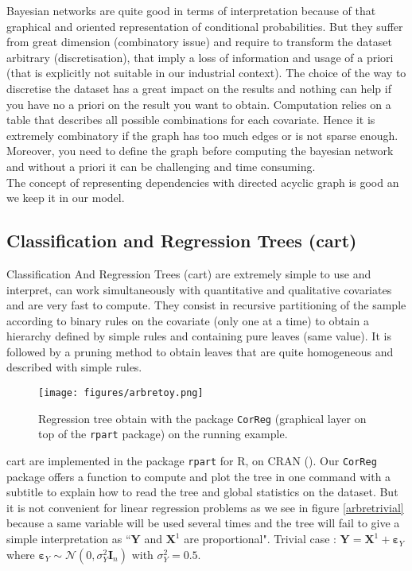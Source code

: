 \documentclass[12pt,a4paper]{report}
\begin{document}
		Bayesian networks are quite good in terms of interpretation because of that graphical and oriented representation of conditional probabilities. But they suffer from great dimension (combinatory issue) and require to transform the dataset arbitrary (discretisation), that imply a loss of information and usage of a priori (that is explicitly not suitable in our industrial context). The choice of the way to discretise the dataset has a great impact on the results and nothing can help if you have no a priori on the result you want to obtain. Computation relies on a table that describes all possible combinations for each covariate. Hence it is extremely combinatory if the graph has too much edges or is not sparse enough. Moreover, you need to define the graph before computing the bayesian network and without a priori it can be challenging and time consuming.\\
		
The concept of representing dependencies with directed acyclic graph is good an we keep it in our model.		
			
	
		
	
\subsection{Classification and Regression Trees ({\sc cart})}

	
		Classification And Regression Trees ({\sc cart}) \cite{breiman1984classification} are extremely simple to use and interpret, can work simultaneously with quantitative and qualitative covariates and are very fast to compute. They consist in recursive partitioning of the sample according to binary rules on the covariate (only one at a time) to obtain a hierarchy defined by simple rules and containing pure leaves (same value). It is followed by a pruning method to obtain leaves that are quite homogeneous and described with simple rules.\\
		
		\begin{figure}
			\centering
				\texttt{[image: figures/arbretoy.png]} 
			\caption{Regression tree obtain with the package {\tt CorReg}
			 (graphical layer on top of  the {\tt rpart} package) on the running example.}\label{arbretoy}
		\end{figure}
		{\sc cart} are implemented in the package {\tt rpart} 
		for R, on CRAN (\cite{packagerpart}). Our {\tt CorReg} 
		package offers a function to compute and plot the tree in one command with a subtitle to explain how to read the tree and global statistics on the dataset.
		But it is not convenient for linear regression problems as we see in figure \ref{arbretrivial} because a same variable will be used several times and the tree will fail to give a simple interpretation as ``$\boldsymbol{Y}$ and $\boldsymbol{X}^1$ are proportional". Trivial case : $\boldsymbol{Y}=\boldsymbol{X}^1 + \boldsymbol{\varepsilon}_Y$ where $\boldsymbol{\varepsilon}_Y \sim \mathcal{N}(0, \sigma^2_Y \boldsymbol{I}_n)$ with $\sigma_Y^2=0.5$. \\
		
\end{document}
